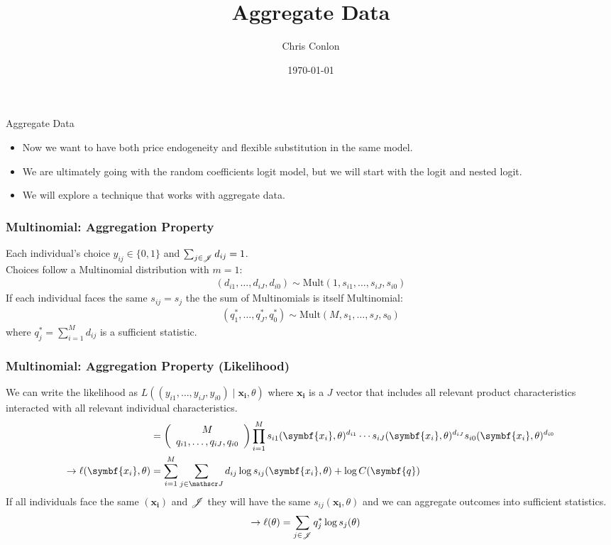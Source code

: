 \documentclass[aspectratio=169,11pt]{beamer}
\title{Aggregate Data}
\author{Chris Conlon}
\institute{Grad IO}
\date{\today}
\begin{document}
\frame{\titlepage}

\begin{frame}{Aggregate Data}
 \begin{itemize}
\item Now we want to have both \alert{price endogeneity} and \alert{flexible substitution} in the same model.
\item We are ultimately going with the random coefficients logit model, but we will start with the logit and nested logit.
\item We will explore a technique that works with \alert{aggregate data}.
 \end{itemize}
\end{frame}



\begin{frame}
\frametitle{Multinomial:  Aggregation Property}
Each individual's choice $y_{ij} \in\{0,1\}$ and $\sum_{j \in \mathscr{J}} d_{ij} =1$.\\

Choices follow a Multinomial distribution with $m=1$:
\begin{align*}
(d_{i1},\ldots,d_{iJ},d_{i0}) \sim \text{Mult} (1,s_{i1},\ldots,s_{iJ},s_{i0} ) 
\end{align*}
If each individual faces the same $s_{ij}=s_j$ the the sum of Multinomials is itself Multinomial:
\begin{align*}
(q_{1}^{*},\ldots,q_{J}^{*},q_{0}^{*}) \sim \text{Mult} (M, s_{1},\ldots,s_{J},s_{0} ) 
\end{align*}
where $q_{j}^{*}=\sum_{i=1}^M d_{ij}$ is a \alert{sufficient statistic}.
\end{frame}

\begin{frame}
\frametitle{Multinomial:  Aggregation Property (Likelihood)}
We can write the likelihood as $L\left((y_{i1},\ldots,y_{iJ},y_{i0})  \mid \symbf{x_i},  \theta \right)$ where $\symbf{x_i}$ is a $J$ vector that includes all relevant product characteristics interacted with all relevant individual characteristics.
\begin{align*}
&=
\left(\begin{array}{c}
M \\
q_{i1},\ldots, q_{iJ}, q_{i0}
\end{array}\right)
\prod_{i=1}^M s_{i1}(\symbf{x_i},\theta)^{d_{i1}}\cdots s_{iJ}(\symbf{x_i},\theta)^{d_{iJ}}  s_{i0}(\symbf{x_i},\theta)^{d_{i0}}\\
\rightarrow \ell(\symbf{x_i},\theta)&= \sum_{i=1}^M \sum_{j \in \calJ} d_{ij} \log s_{ij}(\symbf{x_i},\theta) + \log C(\symbf{q})
\end{align*}
If all individuals face the same $(\symbf{x_i})$ and $\mathscr{J}$ they will have the same $s_{ij}(\symbf{x_i},\theta)$ and we can aggregate outcomes into \alert{sufficient statistics}.
\begin{align*}
\rightarrow \ell(\theta) &=  \sum_{j \in \mathscr{J}} q_{j}^{*} \log s_{j}(\theta)
\end{align*}
\end{frame}
\end{document}
